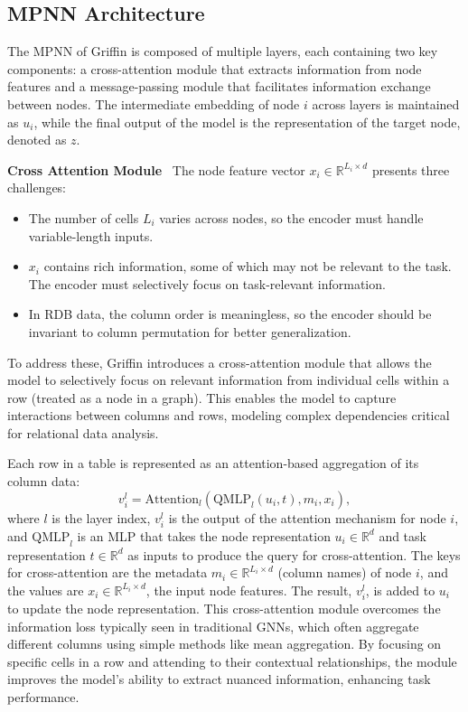 \documentclass{article}
\theoremstyle{plain}
\theoremstyle{definition}
\theoremstyle{remark}
\begin{document}
\subsection{MPNN Architecture}
The MPNN of Griffin is composed of multiple layers, each containing two key components: a cross-attention module that extracts information from node features and a message-passing module that facilitates information exchange between nodes. The intermediate embedding of node $i$ across layers is maintained as $u_i$, while the final output of the model is the representation of the target node, denoted as $z$.

\textbf{Cross Attention Module}~
The node feature vector $x_i \in \mathbb{R}^{L_i \times d}$ presents three challenges:
\begin{itemize}[itemsep=2pt,topsep=-2pt,parsep=0pt,leftmargin=10pt]
    \item The number of cells $L_i$ varies across nodes, so the encoder must handle variable-length inputs.
    \item $x_i$ contains rich information, some of which may not be relevant to the task. The encoder must selectively focus on task-relevant information.
    \item In RDB data, the column order is meaningless, so the encoder should be invariant to column permutation for better generalization.
\end{itemize}
To address these, Griffin introduces a cross-attention module that allows the model to selectively focus on relevant information from individual cells within a row (treated as a node in a graph). This enables the model to capture interactions between columns and rows, modeling complex dependencies critical for relational data analysis.

Each row in a table is represented as an attention-based aggregation of its column data:
\begin{equation}
v_i^l = \text{Attention}_l\left( \text{QMLP}_l(u_i, t), m_i, x_i \right),
\end{equation}
where $l$ is the layer index, $v_i^l$ is the output of the attention mechanism for node $i$, and $\text{QMLP}_l$ is an MLP that takes the node representation $u_i \in \mathbb{R}^d$ and task representation $t \in \mathbb{R}^d$ as inputs to produce the query for cross-attention. The keys for cross-attention are the metadata $m_i \in \mathbb{R}^{L_i \times d}$ (column names) of node $i$, and the values are $x_i \in \mathbb{R}^{L_i \times d}$, the input node features. The result, $v_i^l$, is added to $u_i$ to update the node representation.
This cross-attention module overcomes the information loss typically seen in traditional GNNs, which often aggregate different columns using simple methods like mean aggregation. By focusing on specific cells in a row and attending to their contextual relationships, the module improves the model’s ability to extract nuanced information, enhancing task performance.
\end{document}
